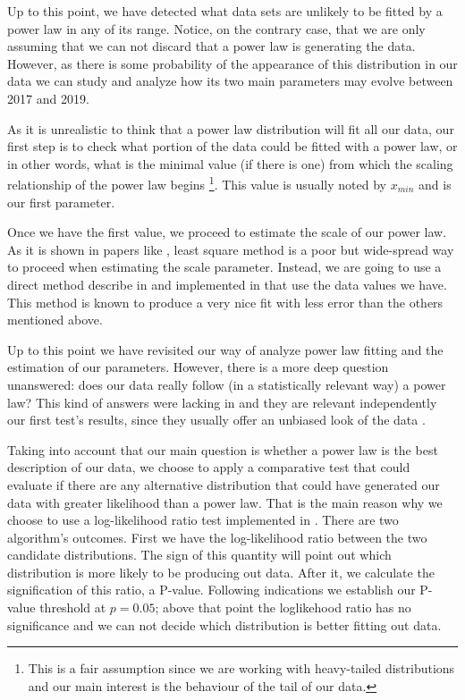 \documentclass{article}
\begin{document}
Up to this point, we have detected what data sets are unlikely to be
fitted by a power law in any of its range. Notice, on the contrary
case, that we are only assuming that we can not discard that a power
law is generating the data.  However, as there is some probability of
the appearance of this distribution in our data we can study and
analyze how its two main parameters may evolve between 2017 and 2019.

As it is unrealistic to think that a power law distribution will fit
all our data, our first step is to check what portion of the data
could be fitted with a power law, or in other words, what is the
minimal value (if there is one) from which the scaling relationship of
the power law begins \footnote{This is a fair assumption since we are
  working with heavy-tailed distributions and our main interest is the
  behaviour of the tail of our data.}.  This value is usually noted by
$x_{min}$ and is our first parameter.

Once we have the first value, we proceed to estimate the scale of our
power law.  As it is shown in papers like \cite{newman2005power,
  clauset2009power}, least square method is a poor but wide-spread
way to proceed when estimating the scale parameter. Instead, we are
going to use a direct method describe in \cite{clauset2009power} and
implemented in \cite{alstott2014powerlaw} that use the data values we
have. This method is known to produce a very nice fit with less error
than the others mentioned above.

Up to this point we have revisited our way of analyze power law
fitting and the estimation of our parameters. However, there is a more
deep question unanswered: does our data really follow (in a
statistically relevant way) a power law?  This kind of answers were
lacking in \cite{merelo2017self} and they are relevant independently
our first test's results, since they usually offer an unbiased look of
the data .

Taking into account that our main question is whether a power law is
the best description of our data, we choose to apply a comparative
test that could evaluate if there are any alternative distribution
that could have generated our data with greater likelihood than a
power law. That is the main reason why we choose to use a
log-likelihood ratio test implemented in \cite{alstott2014powerlaw}.
There are two algorithm's outcomes. First we have the log-likelihood
ratio between the two candidate distributions. The sign of this
quantity will point out which distribution is more likely to be
producing out data. After it, we calculate the signification of this
ratio, a P-value. Following \cite{alstott2014powerlaw} indications we
establish our P-value threshold at $p=0.05$; above that point the
loglikehood ratio has no significance and we can not decide which
distribution is better fitting out data.
\end{document}

